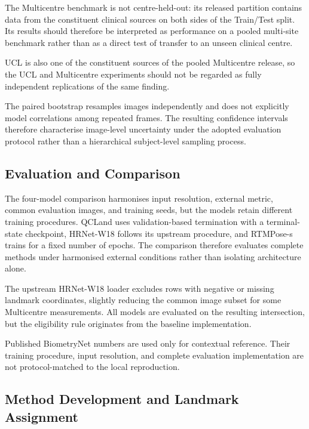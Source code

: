 The Multicentre benchmark is not centre-held-out: its released
partition contains data from the constituent clinical sources on both
sides of the Train/Test split. Its results should therefore be
interpreted as performance on a pooled multi-site benchmark rather
than as a direct test of transfer to an unseen clinical centre.

UCL is also one of the constituent sources of the pooled Multicentre
release, so the UCL and Multicentre experiments should not be regarded
as fully independent replications of the same finding.

The paired bootstrap resamples images independently and does not
explicitly model correlations among repeated frames. The resulting
confidence intervals therefore characterise image-level uncertainty
under the adopted evaluation protocol rather than a hierarchical
subject-level sampling process.


\subsection{Evaluation and Comparison}
\label{sec:discussion-limitations-comparison}
\label{sec:discussion-limitations-resolution}
\label{sec:discussion-limitations-filtering}

The four-model comparison harmonises input resolution, external
metric, common evaluation images, and training seeds, but the models
retain different training procedures. QCLand uses validation-based
termination with a terminal-state checkpoint, HRNet-W18 follows its
upstream procedure, and RTMPose-s trains for a fixed number of epochs.
The comparison therefore evaluates complete methods under harmonised
external conditions rather than isolating architecture alone.

The upstream HRNet-W18 loader excludes rows with negative or missing
landmark coordinates, slightly reducing the common image subset for
some Multicentre measurements. All models are evaluated on the
resulting intersection, but the eligibility rule originates from the
baseline implementation.

Published BiometryNet numbers are used only for contextual reference.
Their training procedure, input resolution, and complete evaluation
implementation are not protocol-matched to the local reproduction.


\subsection{Method Development and Landmark Assignment}
\label{sec:discussion-limitations-method}
\label{sec:discussion-limitations-valset}

